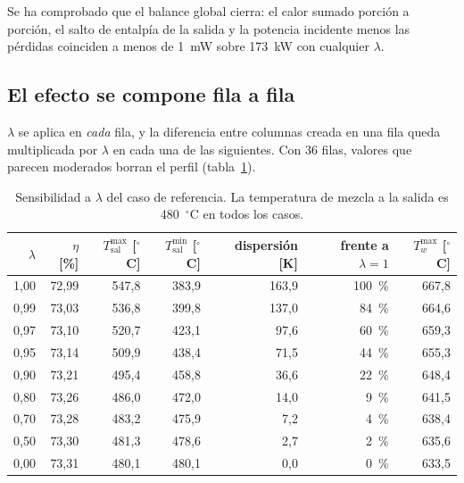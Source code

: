 \documentclass[11pt,a4paper]{article}
\begin{document}
Se ha comprobado que el balance global cierra: el calor sumado porción a porción,
el salto de entalpía de la salida y la potencia incidente menos las pérdidas
coinciden a menos de 1~mW sobre 173~kW con cualquier $\lambda$.

\subsection{El efecto se compone fila a fila}

$\lambda$ se aplica en \emph{cada} fila, y la diferencia entre columnas creada en
una fila queda multiplicada por $\lambda$ en cada una de las siguientes. Con 36
filas, valores que parecen moderados borran el perfil (tabla~\ref{tab:lambda}).

\begin{table}[h]
\centering
\begin{tabular}{rrrrrrr}
  \toprule
  $\lambda$ & $\eta$ [\%] & $T_{\mathrm{sal}}^{\max}$ [$^\circ$C]
  & $T_{\mathrm{sal}}^{\min}$ [$^\circ$C] & dispersión [K] & frente a $\lambda=1$
  & $T_w^{\max}$ [$^\circ$C] \\
  \midrule
  1,00 & 72,99 & 547,8 & 383,9 & 163,9 & 100~\% & 667,8 \\
  0,99 & 73,03 & 536,8 & 399,8 & 137,0 &  84~\% & 664,6 \\
  0,97 & 73,10 & 520,7 & 423,1 &  97,6 &  60~\% & 659,3 \\
  0,95 & 73,14 & 509,9 & 438,4 &  71,5 &  44~\% & 655,3 \\
  0,90 & 73,21 & 495,4 & 458,8 &  36,6 &  22~\% & 648,4 \\
  0,80 & 73,26 & 486,0 & 472,0 &  14,0 &   9~\% & 641,5 \\
  0,70 & 73,28 & 483,2 & 475,9 &   7,2 &   4~\% & 638,4 \\
  0,50 & 73,30 & 481,3 & 478,6 &   2,7 &   2~\% & 635,6 \\
  0,00 & 73,31 & 480,1 & 480,1 &   0,0 &   0~\% & 633,5 \\
  \bottomrule
\end{tabular}
\caption{Sensibilidad a $\lambda$ del caso de referencia. La temperatura de
mezcla a la salida es 480~$^\circ$C en todos los casos.}
\label{tab:lambda}
\end{table}
\end{document}
